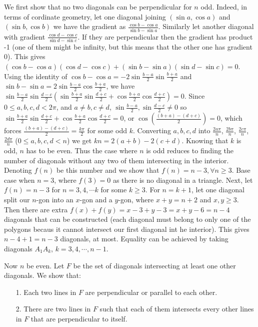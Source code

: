 \documentclass[11pt,a4paper]{article}
\begin{document}
\begin{itemize}
We first show that no two diagonals can be perpendicular for $n$ odd. 
Indeed, in terms of cordinate geometry, let one diagonal joining $(\sin a, \cos a)$ and $(\sin b, \cos b)$ we have the gradient as 
$\frac{\cos b-\cos a}{\sin b-\sin a}$. 
Similarly let another diagonal with gradient 
$\frac{\cos d-\cos c}{\sin d-\sin c}$. 
If they are perpendicular then the gradient has product -1 (one of them might be infinity, but this means that the other one has gradient 0). 
This gives $(\cos b-\cos a)(\cos d-\cos c)+(\sin b-\sin a)(\sin d-\sin c)=0$. 
Using the identity of $\cos b-\cos a=-2\sin\frac{b-a}{2}\sin\frac{b+a}{2}$ and 
$\sin b-\sin a=2\sin\frac{b-a}{2}\cos\frac{b+a}{2}$, we have 
$\sin\frac{b-a}{2}\sin\frac{d-c}{2}(\sin\frac{b+a}{2}\sin\frac{d+c}{2}+\cos\frac{b+a}{2}\cos\frac{d+c}{2})=0$. 
Since $0\le a,b,c,d<2\pi$, and $a\neq b, c\neq d$, 
$\sin\frac{b-a}{2}, \sin\frac{d-c}{2}\neq 0$ so 
$\sin\frac{b+a}{2}\sin\frac{d+c}{2}+\cos\frac{b+a}{2}\cos\frac{d+c}{2}=0$, or 
$\cos (\frac{(b+a)-(d+c)}2)=0$, which forces 
$\frac{(b+a)-(d+c)}2=\frac{k\pi}2$ for some odd $k$. 
Converting $a, b, c, d$ into $\frac{2a\pi}{n}$, $\frac{2b\pi}{n}$, $\frac{2c\pi}{n}$, $\frac{2d\pi}{n}$ ($0\le a, b, c, d < n$) we get 
$kn=2(a+b)-2(c+d)$. 
Knowing that $k$ is odd, $n$ has to be even. 
Thus the case where $n$ is odd reduces to finding the number of diagonals without any two of them intersecting in the interior. 
Denoting $f(n)$ be this number and we show that $f(n)=n-3, \forall n\ge 3$. 
Base case when $n=3$, where $f(3)=0$ as there is no diagonal in a triangle. 
Next, let $f(n)=n-3$ for $n=3, 4, \cdots k$ for some $k\ge 3$. 
For $n=k+1$, let one diagonal split our $n$-gon into an $x$-gon and a $y$-gon, where $x+y=n+2$ and $x, y\ge 3$. 
Then there are extra $f(x)+f(y)=x-3+y-3=x+y-6=n-4$ diagonals that can be constructed (each diagonal must belong to only one of the polygons becaus it cannot intersect our first diagonal int he interior). 
This gives $n-4+1=n-3$ diagonals, at most. 
Equality can be achieved by taking diagonals $A_1A_k$, $k=3, 4, \cdots , n-1$.

Now $n$ be even. Let $F$ be the set of diagonals intersecting at least one other diagonals. We show that: 
\begin{itemize}
\item [1.]
Each two lines in $F$ are perpendicular or parallel to each other. 

\item [2.]
There are two lines in $F$ such that each of them intersects every other lines in $F$ that are perpendicular to itself.


\end{itemize}
\end{itemize}
\end{document}
